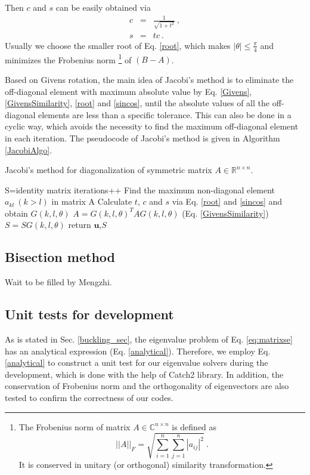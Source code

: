 \documentclass{article}
\begin{document}
Then $c$ and $s$ can be easily obtained via 
\begin{eqnarray}\label{sincos}
c&=&\frac{1}{\sqrt{1+t^2}}\ , \\ 
\nonumber
s&=&tc\ .
\end{eqnarray}
Usually we choose the smaller root of Eq. \ref{root}, which makes $|\theta|\leq\frac{\pi}{4}$ 
and minimizes the Frobenius norm
\footnote{The Frobenius norm of matrix $A\in \mathbb{C}^{n \times n}$ is defined as 
\begin{equation*}
||A||_{F} = \sqrt{\sum_{i=1}^{n}\sum_{j=1}^{n}|a_{ij}|^2}\ . 
\end{equation*}
It is conserved in unitary (or orthogonal) similarity transformation. }
of $(B-A)$. 
\par
Based on Givens rotation, the main idea of Jacobi's method is to eliminate the off-diagonal element with maximum absolute value  
by Eq. \ref{Givens}, \ref{GivensSimilarity}, \ref{root} and \ref{sincos}, 
until the absolute values of all the off-diagonal elements are less than a specific tolerance. 
This can also be done in a cyclic way, which avoids the necessity to find the maximum off-diagonal element in each iteration. 
The pseudocode of Jacobi's method is given in Algorithm \ref{JacobiAlgo}. 
\begin{algorithm}[tb]
	\label{JacobiAlgo}
	\caption{Jacobi's method for diagonalization of symmetric matrix $A\in \mathbb{R}^{n\times n}$. }
    S=identity matrix\; 
    {
    	iterations++\;
    	Find the maximum non-diagonal element $a_{kl}\ (k>l)$ in matrix A\; 
    	Calculate $t$, $c$ and $s$ via Eq. \ref{root} and \ref{sincos} and obtain $G(k,l,\theta)$\; 
	    $A=G(k,l,\theta)^{T}AG(k,l,\theta)$ (Eq. \ref{GivensSimilarity})\; 
	    $S=SG(k,l,\theta)$\;
    }
	return $\mathbf{u}$,$S$\;
\end{algorithm}

	\subsection{Bisection method}
	Wait to be filled by Mengzhi. 
	\subsection{Unit tests for development}\label{unittests}
As is stated in Sec. \ref{buckling_sec}, the eigenvalue problem of Eq. \ref{eq:matrixse} 
has an analytical expression (Eq. \ref{analytical}). 
Therefore, we employ Eq. \ref{analytical} to construct a unit test for our eigenvalue solvers during the development, 
which is done with the help of Catch2 library. 
In addition, the conservation of Frobenius norm and the orthogonality of eigenvectors are also tested 
to confirm the correctness of our codes. 
	
\end{document}
